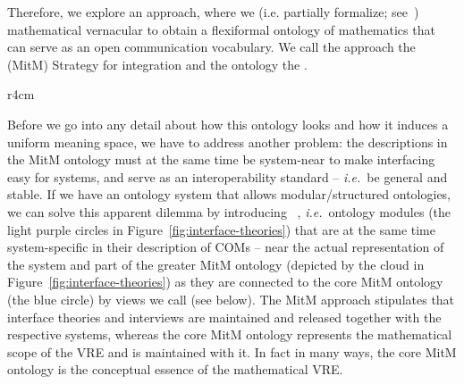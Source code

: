 Therefore, we explore an approach, where we  (i.e. partially formalize;
see~\cite{Kohlhase:tffm13}) mathematical vernacular to obtain a flexiformal ontology of
mathematics that can serve as an open communication vocabulary. We call the approach the
 (MitM) Strategy for integration and the ontology the .

\begin{wrapfigure}r{4cm}\vspace*{-1.5em}
  \vspace*{-.5em}
  \caption{Interface theories}\label{fig:interface-theories}\vspace*{-1em}
\end{wrapfigure}
Before we go into any detail about how this ontology looks and how it induces a uniform
meaning space, we have to address another problem: the descriptions in the MitM ontology
must at the same time be system-near to make interfacing easy for systems, and serve as
an interoperability standard -- \emph{i.e.}\ be general and stable. If we have an ontology system
that allows modular/structured ontologies, we can solve this apparent dilemma by
introducing ~\cite{KohRabSac:fvip11}, \emph{i.e.}\ ontology modules
(the light purple circles in Figure~\ref{fig:interface-theories}) that are at the same
time system-specific in their description of COMs -- near the actual representation of the
system and part of the greater MitM ontology (depicted by the cloud in
Figure~\ref{fig:interface-theories}) as they are connected to the core MitM ontology (the
blue circle) by views we call  (see below). The MitM approach
stipulates that interface theories and interviews are maintained and released together with
the respective systems, whereas the core MitM ontology represents the mathematical scope
of the VRE and is maintained with it. In fact in many ways, the core MitM ontology is the
conceptual essence of the mathematical VRE.

